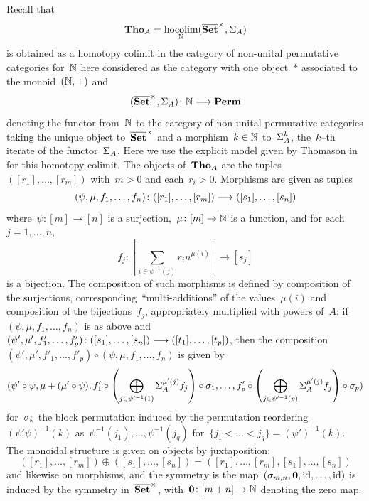 Recall that 
$$\mathbf{Tho}_A=\operatorname*{hocolim}_{\mathbb{N}}(\overline{\mathbf{Set}}^\times,\Sigma_A)$$
is obtained as a homotopy colimit in the category of non-unital permutative categories for~$\mathbb{N}$ here considered as the category with one object~$*$ associated to the monoid~$(\mathbb{N},+)$ and 
$$(\overline{\mathbf{Set}}^\times,\Sigma_A)\colon \mathbb{N}\longrightarrow \mathbf{Perm}$$ 
denoting the functor from~$\mathbb{N}$ to the category of non-unital 
permutative categories taking the unique object to~$\overline{\mathbf{Set}}^\times$ and a morphism~$k\in \mathbb{N}$ to~$\Sigma_A^k$, the~$k$--th iterate of the functor~$\Sigma_A$.  
Here we use the explicit model given by Thomason in~\cite[Construction 3.22]{Thomason} for this homotopy colimit.
The objects of~$\mathbf{Tho}_A$ are the tuples~$([r_1],\dots,[r_m])$ with~$m>0$ and each~$r_i>0$.
Morphisms are given as tuples
\[
(\psi,\mu,f_1,\dots,f_{n})\colon ([r_1],\dots,[r_{m}])\longrightarrow ([s_1],\dots,[s_{n}])
\] 
where~$\psi\colon [m]\to [n]$ is a surjection,~$\mu\colon [m]\to\mathbb{N}$ is a function, and for each $j=1,\dots,n$,
\[
f_j\colon [\sum_{i\in\psi^{-1}(j)} r_in^{\mu(i)}]\longrightarrow [s_j]
\]
is a bijection. 
The composition of such morphisms is defined by composition of the surjections, corresponding~``multi-additions'' of the values~$\mu(i)$ and composition of the bijections~$f_j$, appropriately multiplied with powers of~$A$: if~$(\psi,\mu,f_1,\dots,f_{n})$ is as above and~$(\psi',\mu',f'_1,\dots,f'_{p})\colon ([s_1],\dots,[s_{n}])\longrightarrow ([t_1],\dots,[t_{p}])$, then the composition~$(\psi',\mu',f'_1,\dots,f'_{p})\circ (\psi,\mu,f_1,\dots,f_{n})$ 
is given by
\[
(\psi'\circ \psi,
\mu+(\mu'\circ\psi),
f'_1\circ\left(\bigoplus_{j\in \psi'^{-1}(1)}\Sigma_A^{\mu'(j)}f_j\right)\circ\sigma_1,
\dots,
f'_p\circ\left(\bigoplus_{j\in \psi'^{-1}(p)}\Sigma_A^{\mu'(j)}f_j\right)\circ \sigma_p
)
\]
for~$\sigma_k$ the block permutation induced by the permutation reordering~$(\psi'\psi)^{-1}(k)$ as~$\psi^{-1}(j_1),\dots,\psi^{-1}(j_q)$ for~$\{j_1<\dots<j_q\}=(\psi')^{-1}(k)$. 
The monoidal structure is given on objects by juxtaposition: 
\[
([r_1],\dots,[r_{m}])\oplus ([s_1],\dots,[s_{n}])=([r_1],\dots,[r_{m}],[s_1],\dots,[s_{n}])
\]
and likewise on morphisms, 
and the symmetry is the map~$(\sigma_{m,n},{\bf 0},\operatorname{id},\dots,\operatorname{id})$ is induced by the symmetry in~$\overline{\mathbf{Set}}^\times$, with~${\bf 0}\colon[m+n]\to \mathbb{N}$ denoting the zero map. 


